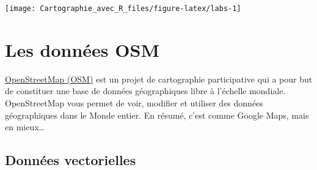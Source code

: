 \documentclass[]{book}
\begin{document}
\begin{center}\texttt{[image: Cartographie\_avec\_R\_files/figure-latex/labs-1]} \end{center}

\section{Les données OSM}\label{les-donnees-osm}

\href{https://www.openstreetmap.org}{OpenStreetMap (OSM)} est un projet
de cartographie participative qui a pour but de constituer une base de
données géographiques libre à l'échelle mondiale. OpenStreetMap vous
permet de voir, modifier et utiliser des données géographiques dans le
Monde entier. En résumé, c'est comme Google Maps, mais en mieux\ldots{}

\subsection{Données vectorielles}\label{donnees-vectorielles}
\end{document}
